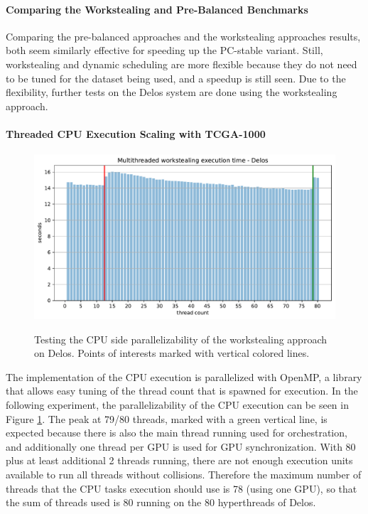 \paragraph{Comparing the Workstealing and Pre-Balanced Benchmarks}
Comparing the pre-balanced approaches and the workstealing approaches results, both seem similarly effective for speeding up the PC-stable variant. Still, workstealing and dynamic scheduling are more flexible because they do not need to be tuned for the dataset being used, and a speedup is still seen. Due to the flexibility, further tests on the Delos system are done using the workstealing approach.

\paragraph{Threaded CPU Execution Scaling with TCGA-1000}
\begin{figure}[H]
  \caption{Testing the CPU side parallelizability of the workstealing approach on Delos. Points of interests marked with vertical colored lines.}
  \includegraphics[width=\textwidth]{figures/threaded_wsteal.pdf}
  \centering
  \label{fig:wstealing_threaded_delos}
\end{figure}

The implementation of the CPU execution is parallelized with OpenMP, a library that allows easy tuning of the thread count that is spawned for execution. In the following experiment, the parallelizability of the CPU execution can be seen in Figure \ref{fig:wstealing_threaded_delos}.
The peak at 79/80 threads, marked with a green vertical line, is expected because there is also the main thread running used for orchestration, and additionally one thread per GPU is used for GPU synchronization. With 80 plus at least additional 2 threads running, there are not enough execution units available to run all threads without collisions. Therefore the maximum number of threads that the CPU tasks execution should use is 78 (using one GPU), so that the sum of threads used is 80 running on the 80 hyperthreads of Delos.

